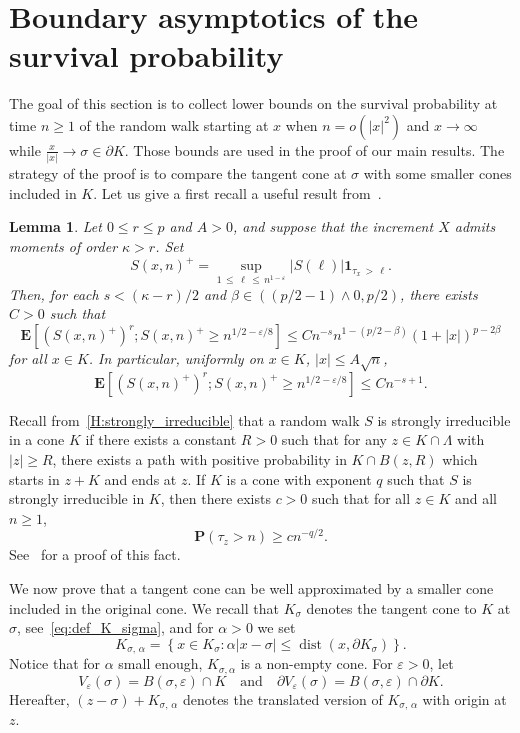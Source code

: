 \documentclass[10pt]{amsart}
\newtheorem{lemm}[theo]{Lemma}\newtheorem{prop}[theo]{Proposition}\newtheorem{coro}[theo]{Corollary}\newtheorem{conj}[theo]{Conjecture}
\theoremstyle{definition}\newtheorem{defi}[theo]{Definition}\newtheorem{rema}[theo]{Remark}\newtheorem{exam}[theo]{Example}\newtheorem{exem}[theo]{Example}\newtheorem{nota}[theo]{Notation}
\DeclareMathOperator{\dist}{dist}
\newcommand{\pr}{\mathbf{P}}
\newcommand{\e}{\mathbf{E}}
\newcommand{\ind}{\mathbf{1}}
\renewcommand{\epsilon}{\varepsilon}
\renewcommand{\leq}{\leqslant}
\renewcommand{\geq}{\geqslant}
\begin{document}
\appendix
{}

\section{Boundary asymptotics of the survival probability}\label{sec:survival}

The goal of this section is to collect lower bounds on the survival probability at time $n\geq 1$ of the random walk starting at $x$ when $n=o(|x|^{2})$ and $x\rightarrow \infty$ while $\frac{x}{|x|}\rightarrow \sigma\in \partial K$. Those bounds are used in the proof of our main results. The strategy of the proof is to compare the tangent cone at $\sigma$ with some smaller cones included in $K$. Let us give a first recall a useful result from~\cite[Lemma~B.1]{RaTa-20}.


\begin{lemm}\label{Lemma_24_revisited}
Let $0\leq r\leq p$ and $A>0$, and suppose that the increment $X$ admits moments of order $\kappa>r$. Set
\[
S(x,n)^{+}=\sup_{1\,\leq\,\ell\,\leq\,n^{1-\epsilon}}
|S(\ell)| \ind_{\tau_{x}\,>\,\ell}.
\]
Then, for each $s<(\kappa-r)/2$ and $\beta\in ((p/2-1)\wedge 0,p/2)$, there exists $C>0$ such that
\[
\e\left[\left(S(x,n)^{+}\right)^{r};S(x,n)^{+}\geq n^{1/2-\epsilon/8}\right]\leq Cn^{-s}n^{1-(p/2-\beta)}(1+|x|)^{p-2\beta}
\]
for all $x\in K$. In particular, uniformly on $x\in K$, $|x|\leq A\sqrt{n}$,
\[
\e\left[\left(S(x,n)^{+}\right)^{r};S(x,n)^{+}\geq n^{1/2-\epsilon/8}\right]\leq Cn^{-s+1}.
\]
\end{lemm}

Recall from~\eqref{H:strongly_irreducible} that a random walk $S$ is strongly irreducible in a cone $K$ if there exists a constant $R>0$ such that for any $z\in K\cap \Lambda$ with $| z|\geq R$, there exists a path with positive probability in $K\cap B(z,R)$ which starts in $z+K$ and ends at $z$. If $K$ is a cone with exponent $q$ such that $S$ is strongly irreducible in $K$, then there exists $c>0$ such that for all $z\in{K}$ and all $n\geq 1$,
\begin{equation}\label{lowerBoundProbSurv}
\pr\left(\tau_{z}>n\right)\geq cn^{-q/2}.
\end{equation}
See~\cite[Lemma~4.5]{RaTa-20} for a proof of this fact.

We now prove that a tangent cone can be well approximated by a smaller cone included in the original cone. We recall that $K_{\sigma}$ denotes the tangent cone to $K$ at $\sigma$, see~\eqref{eq:def_K_sigma}, and for $\alpha>0$ we set
\[
K_{\sigma,\,\alpha}=\left\{ x\in K_{\sigma}: \alpha|x-\sigma|\leq \dist\left(x,\partial K_{\sigma}\right)\right\}.
\]
Notice that for $\alpha$ small enough, $K_{\sigma,\alpha}$ is a non-empty cone. For $\epsilon>0$, let
\[
V_{\epsilon}(\sigma)=B(\sigma,\epsilon)\cap K\quad \text{and}\quad \partial V_{\epsilon}(\sigma)=B(\sigma,\epsilon)\cap \partial K.
\]
Hereafter, $(z-\sigma)+K_{\sigma,\,\alpha}$ denotes the translated version of $K_{\sigma,\,\alpha}$ with origin at $z$.
\end{document}

